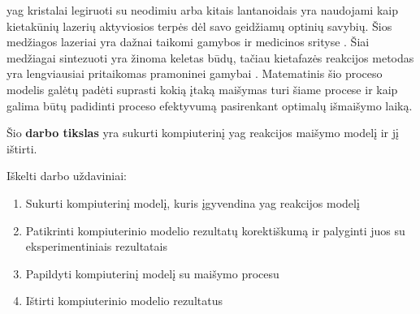 




\ac{yag} kristalai legiruoti su neodimiu arba kitais lantanoidais yra naudojami kaip kietakūnių lazerių aktyviosios terpės dėl savo geidžiamų optinių savybių. Šios medžiagos lazeriai yra dažnai taikomi gamybos ir medicinos srityse \cite{dubeyExperimentalStudyNd2008, valentiUseErYAG2021}. Šiai medžiagai sintezuoti yra žinoma keletas būdų, tačiau kietafazės reakcijos metodas yra lengviausiai pritaikomas pramoninei gamybai \cite{bhattacharyyaMethodsSynthesisY3AI5O122007}. Matematinis šio proceso modelis galėtų padėti suprasti kokią įtaką maišymas turi šiame procese ir kaip galima būtų padidinti proceso efektyvumą pasirenkant optimalų išmaišymo laiką.


Šio \textbf{darbo tikslas} yra sukurti kompiuterinį \acs{yag} reakcijos maišymo modelį ir jį ištirti.

Iškelti darbo uždaviniai:

\begin{enumerate}
\item Sukurti kompiuterinį modelį, kuris įgyvendina \acs{yag} reakcijos modelį
\item Patikrinti kompiuterinio modelio rezultatų korektiškumą ir palyginti juos su eksperimentiniais rezultatais
\item Papildyti kompiuterinį modelį su maišymo procesu
\item Ištirti kompiuterinio modelio rezultatus
\end{enumerate}